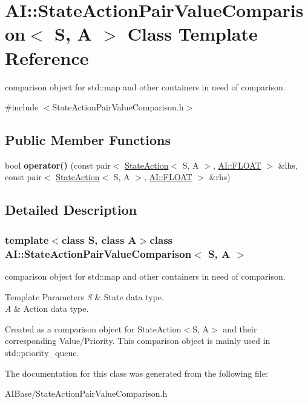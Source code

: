 \hypertarget{classAI_1_1StateActionPairValueComparison}{\section{A\+I\+:\+:State\+Action\+Pair\+Value\+Comparison$<$ S, A $>$ Class Template Reference}
\label{classAI_1_1StateActionPairValueComparison}
}


comparison object for std\+::map and other containers in need of comparison.  




{\ttfamily \#include $<$State\+Action\+Pair\+Value\+Comparison.\+h$>$}

\subsection*{Public Member Functions}
\begin{DoxyCompactItemize}
\item 
\hypertarget{classAI_1_1StateActionPairValueComparison_aa21d4f2cb12071606b09296288094a8e}{bool {\bfseries operator()} (const pair$<$ \hyperlink{classAI_1_1StateAction}{State\+Action}$<$ S, A $>$, \hyperlink{namespaceAI_a41b74884a20833db653dded3918e05c3}{A\+I\+::\+F\+L\+O\+A\+T} $>$ \&lhs, const pair$<$ \hyperlink{classAI_1_1StateAction}{State\+Action}$<$ S, A $>$, \hyperlink{namespaceAI_a41b74884a20833db653dded3918e05c3}{A\+I\+::\+F\+L\+O\+A\+T} $>$ \&rhs)}\label{classAI_1_1StateActionPairValueComparison_aa21d4f2cb12071606b09296288094a8e}

\end{DoxyCompactItemize}


\subsection{Detailed Description}
\subsubsection*{template$<$class S, class A$>$class A\+I\+::\+State\+Action\+Pair\+Value\+Comparison$<$ S, A $>$}

comparison object for std\+::map and other containers in need of comparison. 


\begin{DoxyTemplParams}{Template Parameters}
{\em S} & State data type. \\
\hline
{\em A} & Action data type.\\
\hline
\end{DoxyTemplParams}
Created as a comparison object for State\+Action$<$\+S, A$>$ and their corresponding Value/\+Priority. This comparison object is mainly used in std\+::priority\+\_\+queue. 

The documentation for this class was generated from the following file\+:\begin{DoxyCompactItemize}
\item 
A\+I\+Base/State\+Action\+Pair\+Value\+Comparison.\+h\end{DoxyCompactItemize}
